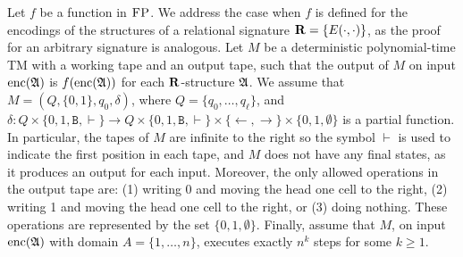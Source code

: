 %
%
%

\newcommand{\ttB}{\mathtt{B}}
\newcommand{\successor}{\text{succ}}

Let $f$ be a function in $\text{\sc FP}$. We address the case when $f$ is defined for the encodings of the structures of a relational signature $\mathbf{R} = \{ E(\cdot, \cdot) \}$, as the proof for an arbitrary signature is analogous.
 Let $M$ be a deterministic polynomial-time TM with a working tape and an output tape, such that the output of $M$ on input ${\rm enc}(\mathfrak{A})$ is $f({\rm enc}(\mathfrak{A}))$ for each $\mathbf{R}$-structure $\mathfrak{A}$. We assume that $M = (Q,\{0,1\},q_0,\delta)$, 
 where $Q = \{q_0,\ldots,q_{\ell}\}$, and $\delta:Q\times\{0,1,\ttB, \vdash\}\to Q\times\{0,1,\ttB, \vdash\}\times \{\leftarrow,\rightarrow\}\times\{0,1,\emptyset\}$ is a partial function. In particular, the tapes of $M$ are infinite to the right so the symbol $\vdash$ is used to indicate the first position in each tape, and $M$ does not have any final states, as it produces an output for each input. Moreover, the only allowed operations in the output tape are: 
 (1) writing 0 and moving the head one cell to the right, (2) writing 1 and moving the head one cell to the right, or (3) doing nothing. These operations are represented by the set $\{0,1,\emptyset\}$. Finally, assume that $M$, on input ${\rm enc}(\mathfrak{A})$ with domain $A = \{1,\dots,n\}$, executes exactly $n^k$ steps for some $k \geq 1$.


